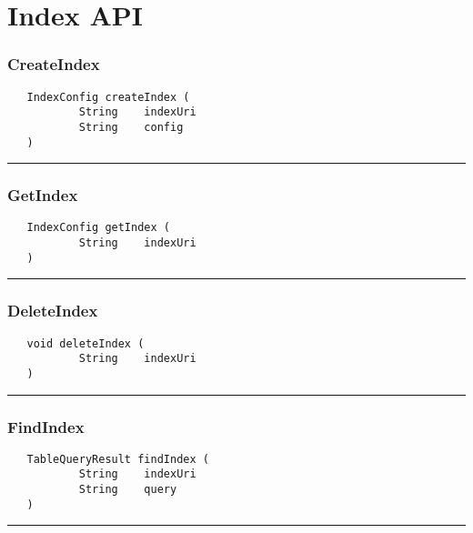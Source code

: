 \chapter{Index API}

\subsection{CreateIndex}
\label{Api:CreateIndex}
\begin{verbatim}
   IndexConfig createIndex (
           String    indexUri
           String    config
   )
\end{verbatim}



\rule{15cm}{2pt}
\subsection{GetIndex}
\label{Api:GetIndex}
\begin{verbatim}
   IndexConfig getIndex (
           String    indexUri
   )
\end{verbatim}



\rule{15cm}{2pt}
\subsection{DeleteIndex}
\label{Api:DeleteIndex}
\begin{verbatim}
   void deleteIndex (
           String    indexUri
   )
\end{verbatim}



\rule{15cm}{2pt}
\subsection{FindIndex}
\label{Api:FindIndex}
\begin{verbatim}
   TableQueryResult findIndex (
           String    indexUri
           String    query
   )
\end{verbatim}



\rule{15cm}{2pt}
